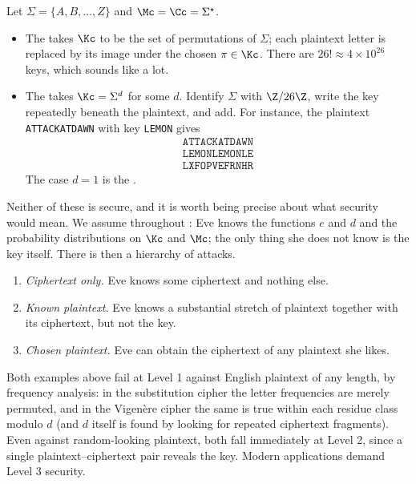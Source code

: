 \begin{example}
	Let $\Sigma = \{A,B,\dots,Z\}$ and $\Mc = \Cc = \Sigma^\star$.
	\begin{itemize}
		\item The  takes $\Kc$ to be the set of permutations of $\Sigma$; each plaintext letter is replaced by its image under the chosen $\pi \in \Kc$. There are $26! \approx 4\times10^{26}$ keys, which sounds like a lot.
		\item The  takes $\Kc = \Sigma^d$ for some $d$. Identify $\Sigma$ with $\Z/26\Z$, write the key repeatedly beneath the plaintext, and add. For instance, the plaintext \texttt{ATTACKATDAWN} with key \texttt{LEMON} gives
		$$\begin{array}{l}
		\texttt{ATTACKATDAWN}\\ \texttt{LEMONLEMONLE}\\\hline \texttt{LXFOPVEFRNHR}\end{array}$$
		The case $d = 1$ is the .
	\end{itemize}
\end{example}

Neither of these is secure, and it is worth being precise about what security would mean. We assume throughout : Eve knows the functions $e$ and $d$ and the probability distributions on $\Kc$ and $\Mc$; the only thing she does not know is the key itself. There is then a hierarchy of attacks.

\begin{enumerate}[label=\textbf{Level \arabic*.}, leftmargin=*]
	\item \emph{Ciphertext only.} Eve knows some ciphertext and nothing else.
	\item \emph{Known plaintext.} Eve knows a substantial stretch of plaintext together with its ciphertext, but not the key.
	\item \emph{Chosen plaintext.} Eve can obtain the ciphertext of any plaintext she likes.
\end{enumerate}

\begin{remark}
	Both examples above fail at Level 1 against English plaintext of any length, by frequency analysis: in the substitution cipher the letter frequencies are merely permuted, and in the Vigen\`ere cipher the same is true within each residue class modulo $d$ (and $d$ itself is found by looking for repeated ciphertext fragments). Even against random-looking plaintext, both fall immediately at Level 2, since a single plaintext--ciphertext pair reveals the key. Modern applications demand Level 3 security.
\end{remark}

